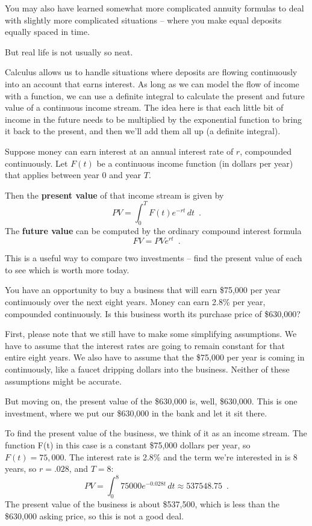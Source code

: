 You may also have learned somewhat more complicated annuity formulas to deal with slightly more complicated situations -- where you make equal deposits equally spaced in time.

But real life is not usually so neat.

Calculus allows us to handle situations where deposits are flowing continuously into an account that earns interest. As long as we can model the flow of income with a function, we can use a definite integral to calculate the present and future value of a continuous income stream. The idea here is that each little bit of income in the future needs to be multiplied by the exponential function to bring it back to the present, and then we'll add them all up (a definite integral).

\begin{definition}
Suppose money can earn interest at an annual interest rate of $r$, compounded continuously. Let $F(t)$ be a continuous income function (in dollars per year) that applies between year $0$ and year $T$.

Then the {\bf present value} of that income stream is given by
$$PV=\int_0^T F(t)e^{-rt}\,dt \enspace.$$
The {\bf future value} can be computed by the ordinary compound interest formula
$$FV=PVe^{rt} \enspace .$$
\end{definition}
This is a useful way to compare two investments -- find the present value of each to see which is worth more today.

\begin{example}
You have an opportunity to buy a business that will earn \$75,000 per year continuously over the next eight years. Money can earn 2.8\% per year, compounded continuously. Is this business worth its purchase price of \$630,000?

\begin{solution}
  First, please note that we still have to make some simplifying assumptions. We have to assume that the interest rates are going to remain constant for that entire eight years. We also have to assume that the \$75,000 per year is coming in continuously, like a faucet dripping dollars into the business. Neither of these assumptions might be accurate.

But moving on, the present value of the \$630,000 is, well, \$630,000. This is one investment, where we put our \$630,000 in the bank and let it sit there.

To find the present value of the business, we think of it as an income stream. The function F(t) in this case is a constant \$75,000 dollars per year, so $F(t)=75,000$. The interest rate is 2.8\% and the term we're interested in is 8 years, so $r=.028$, and $T=8$:
$$PV = \int_0^8 75000e^{-0.028t}\,dt\approx   537548.75 \enspace .$$
The present value of the business is about \$537{,}500, which is less than the \$630,000 asking price, so this is not a good deal.
\end{solution}\end{example}

